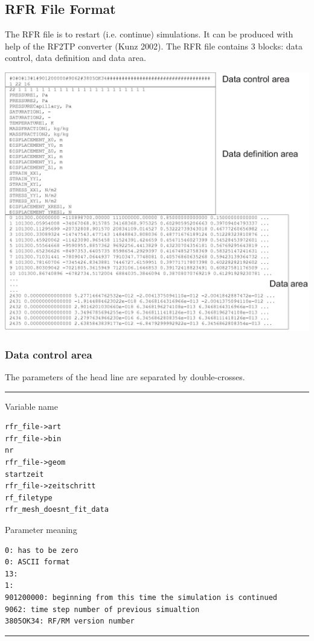 \subsection{RFR File Format}

The RFR file is to restart (i.e. continue) simulations.
It can be produced with help of the RF2TP converter (Kunz 2002).
The RFR file contains 3 blocks: data control, data definition and data area.

\vspace{5mm}
\includegraphics[width=1.0\columnwidth]{figures/rfrfile.eps}  %


\subsubsection{Data control area}

The parameters of the head line are separated by double-crosses.

\footnotesize
\hrule
\begin{minipage}[t]{4cm}
Variable name
\begin{verbatim}
rfr_file->art
rfr_file->bin
nr
rfr_file->geom
startzeit
rfr_file->zeitschritt
rf_filetype
rfr_mesh_doesnt_fit_data
\end{verbatim}
\end{minipage}
%
\begin{minipage}[t]{4cm}
Parameter meaning
\begin{verbatim}
0: has to be zero
0: ASCII format
13:
1:
901200000: beginning from this time the simulation is continued
9062: time step number of previous simualtion
3805OK34: RF/RM version number
\end{verbatim}
\end{minipage}
\hrule
\normalsize

